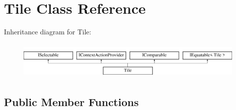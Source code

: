 \hypertarget{class_tile}{}\section{Tile Class Reference}
\label{class_tile}
Inheritance diagram for Tile\+:\begin{figure}[H]
\begin{center}
\leavevmode
\includegraphics[height=1.866667cm]{class_tile}
\end{center}
\end{figure}
\subsection*{Public Member Functions}
